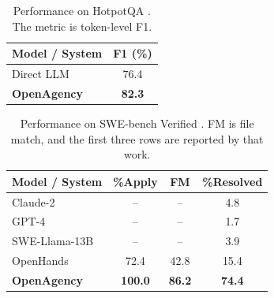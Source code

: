 \documentclass{article} %
\begin{document}
\begin{table}[t]
\caption{Performance on HotpotQA \citep{yang2018hotpotqa}. The metric is token-level F1.}
\label{tab:hotpot}
\begin{center}\small
\begin{tabular}{lc}
\toprule
\textbf{Model / System} & \textbf{F1 (\%)} \\
\midrule
Direct LLM & 76.4 \\
\rowcolor{gray!12}
\textbf{OpenAgency} & \textbf{82.3} \\
\bottomrule
\end{tabular}\end{center}
\end{table}

\begin{table}[t]
\caption{Performance on SWE-bench Verified \citep{jimenez2024swebench}. FM is file match, and the first three rows are reported by that work.}
\label{tab:swe}
\begin{center}
\small
\begin{tabular}{lccc}
\toprule
\textbf{Model / System} & \textbf{\%Apply} & \textbf{FM} & \textbf{\%Resolved} \\
\midrule
Claude-2 & -- & -- & 4.8 \\
GPT-4 & -- & -- & 1.7 \\
SWE-Llama-13B & -- & -- & 3.9 \\
OpenHands                & 72.4 & 42.8 & 15.4 \\
\rowcolor{gray!12}
\textbf{OpenAgency} & \textbf{100.0} & \textbf{86.2} & \textbf{74.4} \\
\bottomrule
\end{tabular}
\end{center}
\end{table}
\end{document}
